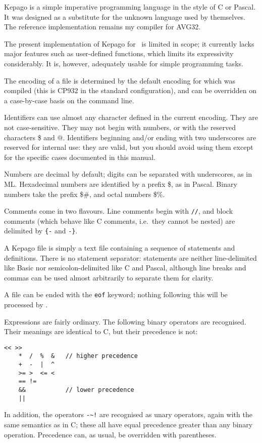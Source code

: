 
Kepago is a simple imperative programming language in the style of C or Pascal.
It was designed as a substitute for the unknown language used by \vas{}
themselves.  The reference implementation remains my  compiler for
AVG32.

The present implementation of Kepago for \reallive\ is limited in scope; it
currently lacks major features such as user-defined functions, which limits its
expressivity considerably.  It is, however, adequately usable for simple
programming tasks.


  The encoding of a file is determined by the default encoding for which
  \compiler{} was compiled (this is CP932 in the standard configuration), and
  can be overridden on a case-by-case basis on the command line.

  Identifiers can use almost any character defined in the current encoding.
  They are not case-sensitive.  They may not begin with numbers, or with the
  reserved characters \$ and @.  Identifiers beginning and/or ending with two
  underscores are reserved for internal use: they are valid, but you should
  avoid using them except for the specific cases documented in this manual.

  Numbers are decimal by default; digits can be separated with underscores, as
  in ML\@.  Hexadecimal numbers are identified by a prefix \$, as in Pascal.
  Binary numbers take the prefix \$\#, and octal numbers \$\%.

  Comments come in two flavours.  Line comments begin with \verb|//|, and
  block comments (which behave like C comments, i.e.\ they cannot be nested)
  are delimited by \verb|{-| and \verb|-}|.


  A Kepago file is simply a text file containing a sequence of statements and
  definitions.  There is no statement separator: statements are neither
  line-delimited like Basic nor semicolon-delimited like C and Pascal, although
  line breaks and commas can be used almost arbitrarily to separate them for
  clarity.

  A file can be ended with the \lstinline|eof| keyword; nothing following this
  will be processed by \compiler.


  Expressions are fairly ordinary.  The following binary operators are
  recognised.  Their meanings are identical to C, but their precedence is not:
  \begin{lstlisting}[escapechar=@]
    << >>
    *  /  %  &   // higher precedence
    +  -  |  ^
    >= >  <= <
    == !=
    &&           // lower precedence
    ||
  \end{lstlisting}
  \noindent In addition, the operators \lstinline|-~!| are recognised as unary
  operators, again with the same semantics as in C; these all have equal
  precedence greater than any binary operation.  Precedence can, as usual, be
  overridden with parentheses.


